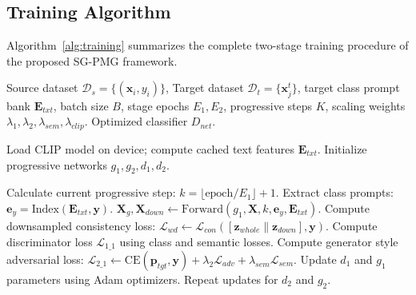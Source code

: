 \subsection{Training Algorithm}
\label{sec:algorithm}

Algorithm~\ref{alg:training} summarizes the complete two-stage training procedure of the proposed SG-PMG framework.

\begin{algorithm}[H]
\caption{Two-Stage Training Procedure of SG-PMG}
\label{alg:training}
\begin{algorithmic}[1]
\REQUIRE Source dataset $\mathcal{D}_s = \{(\mathbf{x}_i, y_i)\}$, Target dataset $\mathcal{D}_t = \{\mathbf{x}_j^t\}$, target class prompt bank $\mathbf{E}_{txt}$, batch size $B$, stage epochs $E_1, E_2$, progressive steps $K$, scaling weights $\lambda_1, \lambda_2, \lambda_{sem}, \lambda_{clip}$.
\ENSURE Optimized classifier $D_{net}$.

\STATE Load CLIP model on device; compute cached text features $\mathbf{E}_{txt}$.
\STATE Initialize progressive networks $g_1, g_2, d_1, d_2$.

\STATE {}
    \STATE Calculate current progressive step: $k = \lfloor \text{epoch}/E_1 \rfloor + 1$.
        \STATE Extract class prompts: $\mathbf{e}_y = \text{Index}(\mathbf{E}_{txt}, \mathbf{y})$.
        \STATE $\mathbf{X}_g, \mathbf{X}_{down} \leftarrow \text{Forward}(g_1, \mathbf{X}, k, \mathbf{e}_y, \mathbf{E}_{txt})$.
        \STATE Compute downsampled consistency loss: $\mathcal{L}_{wd} \leftarrow \mathcal{L}_{con}([\mathbf{z}_{whole} \parallel \mathbf{z}_{down}], \mathbf{y})$.
        \STATE Compute discriminator loss $\mathcal{L}_{1\_1}$ using class and semantic losses.
        \STATE Compute generator style adversarial loss: $\mathcal{L}_{2\_1} \leftarrow \text{CE}(\mathbf{p}_{tgt}, \mathbf{y}) + \lambda_2 \mathcal{L}_{adv} + \lambda_{sem} \mathcal{L}_{sem}$.
        \STATE Update $d_1$ and $g_1$ parameters using Adam optimizers.
        \STATE Repeat updates for $d_2$ and $g_2$.
    \ENDFOR
\ENDFOR


\end{algorithmic}
\end{algorithm}
